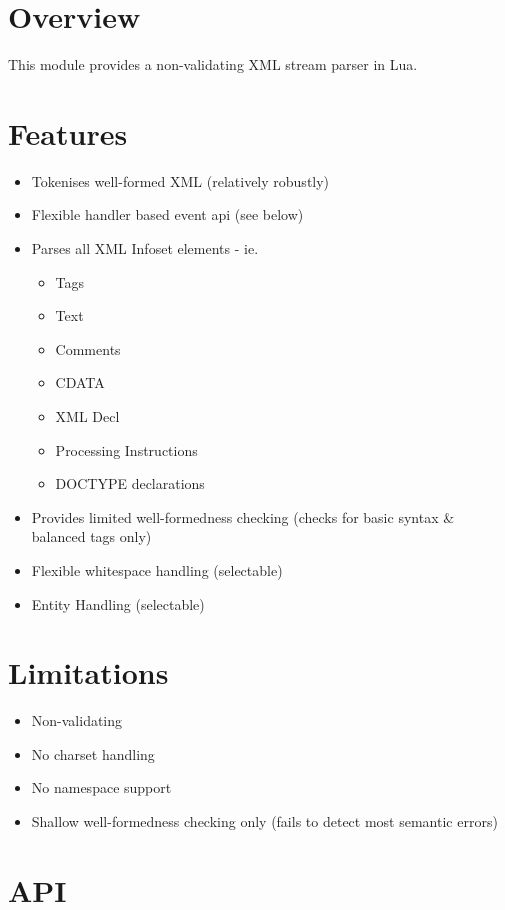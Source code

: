 \documentclass{ltxdoc}
\begin{document}
\section{Overview}


This module provides a non-validating XML stream parser in Lua. 
\section{Features}

\begin{itemize}
\item
  Tokenises well-formed XML (relatively robustly)
\item
  Flexible handler based event api (see below)
\item
  Parses all XML Infoset elements - ie.
  \begin{itemize}
  \item
    Tags
  \item
    Text
  \item
    Comments
  \item
    CDATA
  \item
    XML Decl
  \item
    Processing Instructions
  \item
    DOCTYPE declarations
  \end{itemize}
\item
  Provides limited well-formedness checking (checks for basic syntax \&
  balanced tags only)
\item
  Flexible whitespace handling (selectable)
\item
  Entity Handling (selectable)
\end{itemize}
\section{Limitations}

\begin{itemize}
\item
  Non-validating
\item
  No charset handling
\item
  No namespace support
\item
  Shallow well-formedness checking only (fails to detect most semantic
  errors)
\end{itemize}
\section{API}
\end{document}
